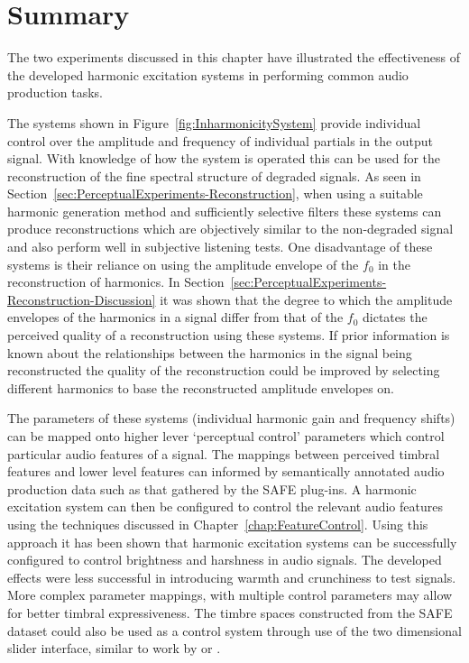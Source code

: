 \section{Summary}
\label{sec:PerceptualExperiments-Summary}
	The two experiments discussed in this chapter have illustrated the effectiveness of the developed harmonic
	excitation systems in performing common audio production tasks. 
	
	The systems shown in Figure~\ref{fig:InharmonicitySystem} provide individual control over the amplitude and
	frequency of individual partials in the output signal. With knowledge of how the system is operated this can be
	used for the reconstruction of the fine spectral structure of degraded signals. As seen in
	Section~\ref{sec:PerceptualExperiments-Reconstruction}, when using a suitable harmonic generation method and
	sufficiently selective filters these systems can produce reconstructions which are objectively similar to the
	non-degraded signal and also perform well in subjective listening tests. One disadvantage of these systems is their
	reliance on using the amplitude envelope of the $f_{0}$ in the reconstruction of harmonics. In
	Section~\ref{sec:PerceptualExperiments-Reconstruction-Discussion} it was shown that the degree to which the
	amplitude envelopes of the harmonics in a signal differ from that of the $f_{0}$ dictates the perceived quality of
	a reconstruction using these systems. If prior information is known about the relationships between the harmonics
	in the signal being reconstructed the quality of the reconstruction could be improved by selecting different
	harmonics to base the reconstructed amplitude envelopes on.

	The parameters of these systems (individual harmonic gain and frequency shifts) can be mapped onto higher lever
	`perceptual control' parameters which control particular audio features of a signal. The mappings between perceived
	timbral features and lower level features can informed by semantically annotated audio production data such as that
	gathered by the SAFE plug-ins. A harmonic excitation system can then be configured to control the relevant audio
	features using the techniques discussed in Chapter~\ref{chap:FeatureControl}. Using this approach it has been shown
	that harmonic excitation systems can be successfully configured to control brightness and harshness in audio
	signals. The developed effects were less successful in introducing warmth and crunchiness to test signals. More
	complex parameter mappings, with multiple control parameters may allow for better timbral expressiveness. The
	timbre spaces constructed from the SAFE dataset could also be used as a control system through use of the two
	dimensional slider interface, similar to work by \citet{schwarz2007corpus} or \citet{stasis2015a}.
